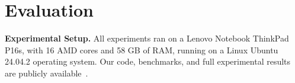 \section{Evaluation}
\label{sec:evaluation}



\noindent
\textbf{Experimental Setup.}
All experiments ran on a Lenovo Notebook ThinkPad P16s, with 16 AMD cores and 58 GB of RAM, running on a Linux Ubuntu 24.04.2 operating system.
%
%
Our code, benchmarks, and full experimental results are publicly available~\cite{ArtifactRepository}.
%
 



